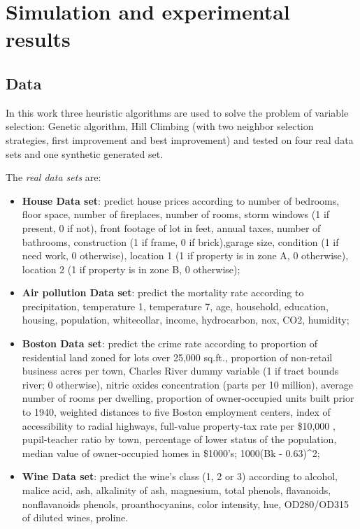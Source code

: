 \chapter{Simulation and experimental results}
\section{Data}
\label{chapt3}
In this work three heuristic algorithms are used to solve the problem of variable selection: Genetic algorithm, Hill Climbing (with two neighbor selection strategies, first improvement and best improvement) and tested on four real data sets and one synthetic generated set.

The \textit{real data sets} are:
\begin{itemize}
	\item \textbf{House Data set}: predict house prices according to number of bedrooms, floor space, number of fireplaces, number of rooms, storm windows (1 if present, 0 if not), front footage of lot in feet, annual taxes, number of bathrooms, construction (1 if frame, 0 if brick),garage size, condition (1 if need work, 0 otherwise), location 1 (1 if property is in zone A, 0 otherwise), location 2 (1 if property is in zone B, 0 otherwise);
	
	\item \textbf{Air pollution Data set}: predict the mortality rate according to precipitation, temperature 1, temperature 7, age, household, education, housing, population, whitecollar, income, hydrocarbon, nox, CO2, humidity;
	
	\item \textbf{Boston Data set}: predict the crime rate according to proportion of residential land zoned for lots over 25,000 sq.ft., proportion of non-retail business acres per town, Charles River dummy variable (1 if tract bounds river; 0 otherwise), nitric oxides concentration (parts per 10 million), average number of rooms per dwelling, proportion of owner-occupied units built prior to 1940, 
	weighted distances to five Boston employment centers, index of accessibility to radial highways, full-value property-tax rate per \$10,000 , pupil-teacher ratio by town, percentage of lower status of the population, median value of owner-occupied homes in \$1000's; 1000\big(Bk - 0.63\big)\string^2;
	
	\item \textbf{Wine Data set}: predict the wine's class (1, 2 or 3) according to alcohol, malice acid, ash, alkalinity of ash, magnesium, total phenols, flavanoids, nonflavanoids phenols, proanthocyanins, color intensity, hue, OD280/OD315 of diluted wines, proline.
\end{itemize}

